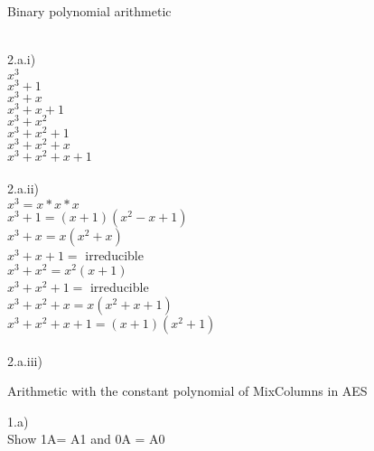 \documentclass{assignment}
\begin{document}
\begin{problemlist}
\pbitem Binary polynomial arithmetic
\begin{problem}
\begin{answer}
\\
2.a.i)\\
$x^3$\\
$x^3+1$\\
$x^3+x$\\
$x^3+x+1$\\
$x^3+x^2$\\
$x^3+x^2+1$\\
$x^3+x^2+x$\\
$x^3+x^2+x+1$\\
\\
2.a.ii)\\
$x^3=x*x*x$\\
$x^3+1=(x+1)(x^2-x+1)$\\
$x^3+x=x(x^2+x)$\\
$x^3+x+1=$ irreducible\\
$x^3+x^2=x^2(x+1)$\\
$x^3+x^2+1=$ irreducible\\
$x^3+x^2+x=x(x^2+x+1)$\\
$x^3+x^2+x+1=(x+1)(x^2+1)$\\
\\
2.a.iii)\\

\end{answer}
\end{problem}

\pbitem Arithmetic with the constant polynomial of
MixColumns
in AES
\begin{problem}
\begin{answer}
1.a)\\
Show 1A= A1
and 0A = A0

\end{answer}
\end{problem}

\end{problemlist}
\end{document}
